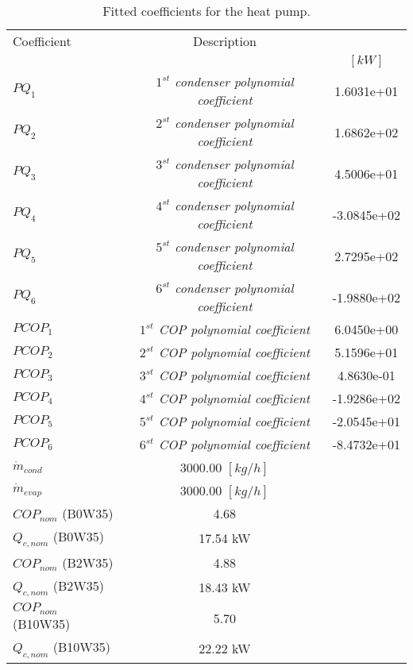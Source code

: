 \documentclass[english]{SPFShortReport}
\author{Dani Carbonell}
\begin{document}
\begin{table}[!ht]
\begin{small}
\caption{Fitted coefficients for the heat pump.}
\begin{center}
\resizebox{12cm}{!} 
{
\begin{tabular}{l | c c } 
\hline
\hline
Coefficient &Description & \\ 
 & &$[kW]$\\ 
\hline
$PQ_{1}$ & \emph{$1^{st}$ condenser polynomial coefficient}  & 1.6031e+01    \\ 
$PQ_{2}$ & \emph{$2^{st}$ condenser polynomial coefficient}  & 1.6862e+02    \\ 
$PQ_{3}$ & \emph{$3^{st}$ condenser polynomial coefficient}  & 4.5006e+01    \\ 
$PQ_{4}$ & \emph{$4^{st}$ condenser polynomial coefficient}  & -3.0845e+02    \\ 
$PQ_{5}$ & \emph{$5^{st}$ condenser polynomial coefficient}  & 2.7295e+02    \\ 
$PQ_{6}$ & \emph{$6^{st}$ condenser polynomial coefficient}  & -1.9880e+02    \\ 
\hline
$PCOP_{1}$ & \emph{$1^{st}$ COP polynomial coefficient}  & 6.0450e+00    \\ 
$PCOP_{2}$ & \emph{$2^{st}$ COP polynomial coefficient}  & 5.1596e+01    \\ 
$PCOP_{3}$ & \emph{$3^{st}$ COP polynomial coefficient}  & 4.8630e-01    \\ 
$PCOP_{4}$ & \emph{$4^{st}$ COP polynomial coefficient}  & -1.9286e+02    \\ 
$PCOP_{5}$ & \emph{$5^{st}$ COP polynomial coefficient}  & -2.0545e+01    \\ 
$PCOP_{6}$ & \emph{$6^{st}$ COP polynomial coefficient}  & -8.4732e+01    \\ 
\hline
$\dot m_{cond}$ & 3000.00 $[kg/h]$\\ 
$\dot m_{evap}$ & 3000.00 $[kg/h]$\\ 
\hline
$COP_{nom}$ (B0W35)& 4.68 \\ 
$Q_{c,nom}$ (B0W35)& 17.54 kW\\ 
$COP_{nom}$ (B2W35)& 4.88 \\ 
$Q_{c,nom}$ (B2W35)& 18.43 kW\\ 
$COP_{nom}$ (B10W35)& 5.70 \\ 
$Q_{c,nom}$ (B10W35)& 22.22 kW\\ 
\hline
\hline
\end{tabular}
}
\label{CoefTable}
\end{center}
\end{small}
\end{table}
\end{document}
